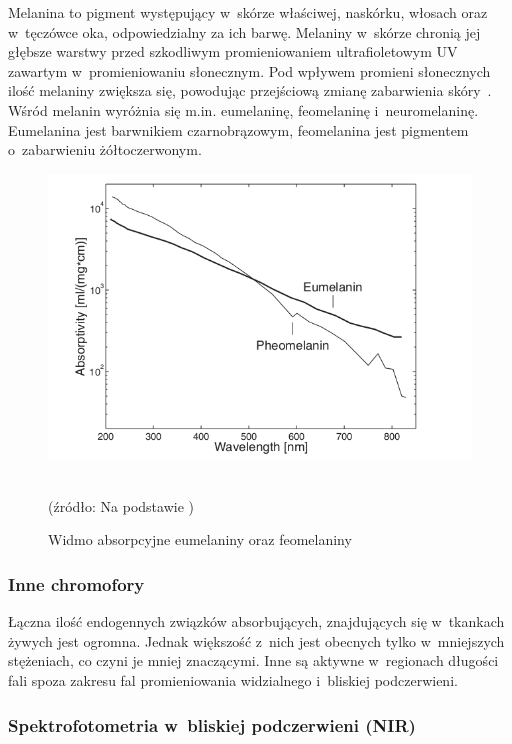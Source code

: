 Melanina to pigment występujący w~skórze właściwej, naskórku, włosach oraz w~tęczówce oka, odpowiedzialny za ich barwę. Melaniny w~skórze chronią jej 
głębsze warstwy przed szkodliwym promieniowaniem ultrafioletowym UV zawartym w~promieniowaniu słonecznym. Pod wpływem promieni słonecznych ilość melaniny 
zwiększa się, powodując przejściową zmianę zabarwienia skóry~\cite{Haggblad:2008}. Wśród melanin wyróżnia się m.in. eumelaninę, feomelaninę i~neuromelaninę. 
Eumelanina jest barwnikiem czarnobrązowym, feomelanina jest pigmentem o~zabarwieniu żółtoczerwonym.
\begin{figure}[h]
\centerline{\includegraphics[scale = 0.55]{graphic/melanin.png}}
	\caption{Widmo absorpcyjne eumelaniny oraz feomelaniny}
	\label{rys:melanin}
	~\\
	(źródło: Na podstawie \cite{Haggblad:2008})
\end{figure}

\subsubsection{Inne chromofory}
\label{subsubsec:hromofory}

Łączna ilość endogennych związków absorbujących, znajdujących się w~tkankach żywych jest ogromna. Jednak większość z~nich jest obecnych tylko
w~mniejszych stężeniach, co czyni je mniej znaczącymi. Inne są aktywne w~regionach długości fali spoza zakresu fal promieniowania widzialnego i~bliskiej podczerwieni.

\subsubsection{Spektrofotometria w~bliskiej podczerwieni (NIR)}
\label{subsubsec:NIR}

